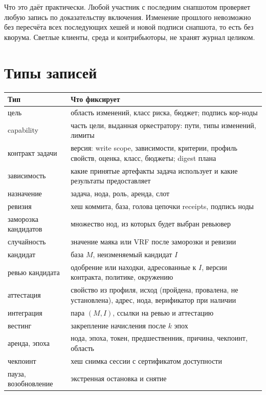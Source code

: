 Что это даёт практически. Любой участник с последним снапшотом проверяет любую запись по доказательству включения. Изменение прошлого невозможно без пересчёта всех последующих хешей и новой подписи снапшота, то есть без кворума. Светлые клиенты, среда и контрибьюторы, не хранят журнал целиком.

\section{Типы записей}

\begin{center}
\small
\begin{tabular}{p{3.4cm} p{10.2cm}}
\toprule
Тип & Что фиксирует \\
\midrule
цель & область изменений, класс риска, бюджет; подпись кор-ноды \\
capability & часть цели, выданная оркестратору: пути, типы изменений, лимиты \\
контракт задачи & версия: write scope, зависимости, критерии, профиль свойств, оценка, класс, бюджеты; digest плана \\
зависимость & какие принятые артефакты задача использует и какие результаты предоставляет \\
назначение & задача, нода, роль, аренда, слот \\
ревизия & хеш коммита, база, голова цепочки receipts, подпись ноды \\
заморозка кандидатов & множество нод, из которых будет выбран ревьювер \\
случайность & значение маяка или VRF после заморозки и ревизии \\
кандидат & база $M$, неизменяемый кандидат $I$ \\
ревью кандидата & одобрение или находки, адресованные к $I$, версии контракта, политике, окружению \\
аттестация & свойство из профиля, исход (пройдена, провалена, не установлена), адрес, нода, верификатор при наличии \\
интеграция & пара $(M, I)$, ссылки на ревью и аттестацию \\
вестинг & закрепление начисления после $k$ эпох \\
аренда, эпоха & нода, эпоха, токен, предшественник, причина, чекпоинт, область \\
чекпоинт & хеш снимка сессии с сертификатом доступности \\
пауза, возобновление & экстренная остановка и снятие \\

\end{tabular}
\end{center}

